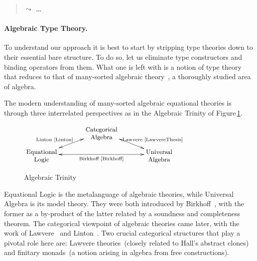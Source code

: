 \documentclass[11pt,twocolumn]{article}
\newcommand{\note}[1]{\begin{quote}{\color{blue}$\leadsto$ \bf\em
      #1}\end{quote}}
\begin{document}
\note{\ldots}

\setcounter{paragraph}{0}
\paragraph{Algebraic Type Theory.}
\label{AlgebraicTypeTheoryParagraph}

To understand our approach it is best to start by stripping type theories
down to their essential bare structure.  To do so, let us eliminate type
constructors and binding operators from them.  What one is left with is a
notion of type theory that reduces to that of many-sorted algebraic
theory~\cite{Birkhoff}, a thoroughly studied area of algebra.

The modern understanding of many-sorted algebraic equational theories is
through three interrelated perspectives as in the Algebraic Trinity of
Figure\,\ref{AlgebraicTrinity}.
\begin{figure}[h]
  \caption{Algebraic Trinity}
  \vspace*{2mm}
  \begin{center}$\xymatrix@R=7.5pt@C=35pt{
      & \txt{\small Categorical\\ \small Algebra} 
      \ar@{<->}[dr]^(.55){\null\hspace*{5mm}\txt{\scriptsize Lawvere~\cite{LawvereThesis}}}
      \ar@{<->}[dl]_(.55){\null\hspace*{-10mm}\txt{\scriptsize Linton~\cite{Linton}}}
      & 
      \\
      \txt{\small Equational\\ \small Logic}
      \ar@{<->}[rr]_-{\txt{\scriptsize Birkhoff~\cite{Birkhoff}}}
      &
      & 
      \txt{\small Universal\\ \small Algebra} 
    }$\end{center}
  \vspace*{-2mm}
\label{AlgebraicTrinity}
\end{figure}
Equational Logic is the metalanguage of algebraic theories, while
Universal Algebra is its model theory.  They were both introduced by
Birkhoff~\cite{Birkhoff}, with the former as a by-product of the latter
related by a soundness and completeness theorem.  The categorical
viewpoint of algebraic theories came later, with the work of
Lawvere~\cite{LawvereThesis} and Linton~\cite{Linton}.  Two crucial
categorical structures that play a pivotal role here are: Lawvere
theories~(closely related to Hall's abstract clones) and finitary
monads~(a notion 
arising in algebra from free constructions).
\end{document}
